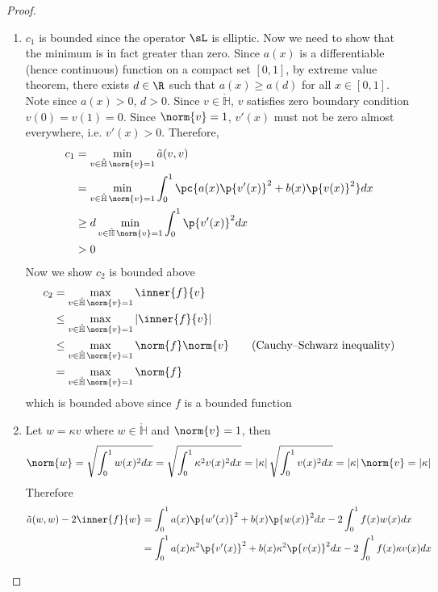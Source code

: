 \documentclass[11pt]{article}
\begin{document}
\begin{proof}
\begin{enumerate}
    \item $c_1$ is bounded since the operator $\sL$ is elliptic. Now we need to show that the minimum is in fact greater than zero. Since $a(x)$ is a differentiable (hence continuous) function on a compact set $[0,1]$, by extreme value theorem, there exists $d \in\R$ such that $a(x) \geq a(d)$ for all $x\in[0,1]$. Note since $a(x) > 0$, $d > 0$. Since $v \in \mathring{\mathbb{H}}$, $v$ satisfies zero boundary condition $v(0)=v(1)=0$. Since $\norm{v} = 1$, $v'(x)$ must not be zero almost everywhere, i.e. $v'(x) > 0$. Therefore,
    \begin{align*}
        c_1 
        &= \min_{v\in\mathring{\mathbb{H}} \, \norm{v}=1} \ta(v,v) \\
        &= \min_{v\in\mathring{\mathbb{H}} \, \norm{v}=1} \int_0^1 \pc{
            a(x) \p{v'(x)}^2 + b(x)\p{v(x)}^2 
        } dx \\
        &\geq d \min_{v\in\mathring{\mathbb{H}} \, \norm{v}=1}  \int_0^1 \p{v'(x)}^2 dx \\
        &> 0
    \end{align*}
    Now we show $c_2$ is bounded above
    \begin{align*}
        c_2
        &= \max_{v\in\mathring{\mathbb{H}} \, \norm{v}=1} \inner{f}{v} \\
        &\leq \max_{v\in\mathring{\mathbb{H}} \, \norm{v}=1} \abs{\inner{f}{v}} \\
        &\leq \max_{v\in\mathring{\mathbb{H}} \, \norm{v}=1} \norm{f}\norm{v} \tag{Cauchy–Schwarz inequality} \\
        &= \max_{v\in\mathring{\mathbb{H}} \, \norm{v}=1} \norm{f}
    \end{align*}
    which is bounded above since $f$ is a bounded function
    \item Let $w = \kappa v$ where $w\in\mathring{\mathbb{H}}$ and $\norm{v} = 1$, then 
    \[
        \norm{w} 
        = \sqrt{\int_0^1 w(x)^2 dx}
        = \sqrt{\int_0^1 \kappa^2 v(x)^2 dx}
        = \abs{\kappa} \sqrt{\int_0^1 v(x)^2 dx}
        = \abs{\kappa} \norm{v}
        = \abs{\kappa}
    \]
    Therefore
    \begin{align*}
        \ta(w,w) - 2\inner{f}{w}
        &= \int_0^1 a(x) \p{w'(x)}^2 + b(x) \p{w(x)}^2 dx - 2\int_0^1 f(x)w(x) dx \\
        &= \int_0^1 a(x) \kappa^2 \p{v'(x)}^2 + b(x) \kappa^2 \p{v(x)}^2 dx - 2\int_0^1 f(x)\kappa v(x) dx \\

\end{align*}
\end{enumerate}
\end{proof}
\end{document}
